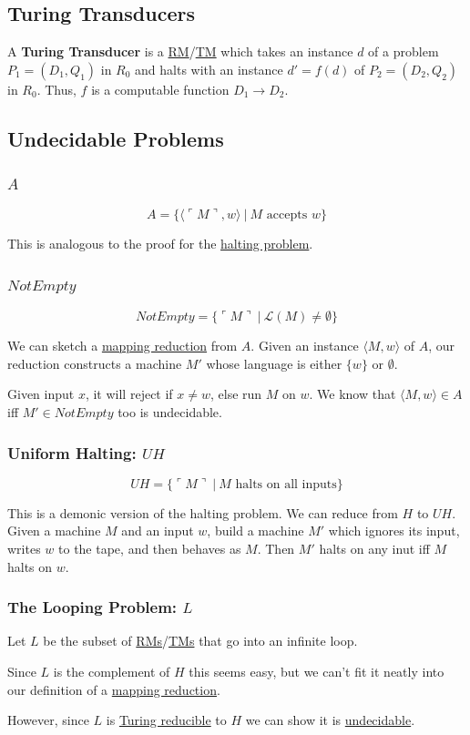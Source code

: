 \documentclass{article}
\begin{document}
\subsection{Turing Transducers}\label{turing-transducer}
A \textbf{Turing Transducer} is a \hyperref[rm]{RM}/\hyperref[tm]{TM} which takes an instance $d$ of a problem $P_1 = (D_1, Q_1)$ in $R_0$ and halts with an instance $d' = f(d)$ of $P_2 = (D_2, Q_2)$ in $R_0$. Thus, $f$ is a computable function $D_1 \to D_2$.


\subsection{Undecidable Problems}\label{undecidable-problems}
\subsubsection{$A$}
\[A = \{\langle \ulcorner M \urcorner, w \rangle \:|\: M \text{ accepts } w\}\]

This is analogous to the proof for the \hyperref[halting]{halting problem}.

\subsubsection{$NotEmpty$}
\[NotEmpty = \{\ulcorner M \urcorner \:|\: \mathcal{L}(M) \neq \emptyset\}\]

We can sketch a \hyperref[mapping-reduction]{mapping reduction} from $A$. Given an instance $\langle M, w \rangle$ of $A$, our reduction constructs a machine $M'$ whose language is either $\{w\}$ or $\emptyset$.

Given input $x$, it will reject if $x \neq w$, else run $M$ on $w$. We know that $\langle M, w \rangle \in A$ iff $M' \in NotEmpty$ too is undecidable.

\subsubsection{Uniform Halting: $UH$}
\[UH = \{\ulcorner M \urcorner \:|\: M \text{ halts on all inputs}\}\]

This is a demonic version of the halting problem. We can reduce from $H$ to $UH$. Given a machine $M$ and an input $w$, build a machine $M'$ which ignores its input, writes $w$ to the tape, and then behaves as $M$. Then $M'$ halts on any inut iff $M$ halts on $w$.

\subsubsection{The Looping Problem: $L$}\label{looping}
Let $L$ be the subset of \hyperref[rm]{RMs}/\hyperref[tm]{TMs} that go into an infinite loop.

Since $L$ is the complement of \hyperref[halting]{$H$} this seems easy, but we can't fit it neatly into our definition of a \hyperref[mapping-reduction]{mapping reduction}.

However, since $L$ is \hyperref[turing-reduction]{Turing reducible} to $H$ we can show it is \hyperref[undecidable]{undecidable}.
\end{document}
